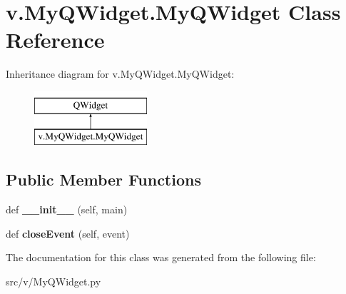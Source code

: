 \hypertarget{classv_1_1_my_q_widget_1_1_my_q_widget}{}\section{v.\+My\+Q\+Widget.\+My\+Q\+Widget Class Reference}
\label{classv_1_1_my_q_widget_1_1_my_q_widget}
Inheritance diagram for v.\+My\+Q\+Widget.\+My\+Q\+Widget\+:\begin{figure}[H]
\begin{center}
\leavevmode
\includegraphics[height=2.000000cm]{classv_1_1_my_q_widget_1_1_my_q_widget}
\end{center}
\end{figure}
\subsection*{Public Member Functions}
\begin{DoxyCompactItemize}
\item 
\hypertarget{classv_1_1_my_q_widget_1_1_my_q_widget_a9d705067615efa1682c2a157efe996ca}{}def {\bfseries \+\_\+\+\_\+init\+\_\+\+\_\+} (self, main)\label{classv_1_1_my_q_widget_1_1_my_q_widget_a9d705067615efa1682c2a157efe996ca}

\item 
\hypertarget{classv_1_1_my_q_widget_1_1_my_q_widget_afd8763a2d02447f83b187ad82973077f}{}def {\bfseries close\+Event} (self, event)\label{classv_1_1_my_q_widget_1_1_my_q_widget_afd8763a2d02447f83b187ad82973077f}

\end{DoxyCompactItemize}


The documentation for this class was generated from the following file\+:\begin{DoxyCompactItemize}
\item 
src/v/My\+Q\+Widget.\+py\end{DoxyCompactItemize}

